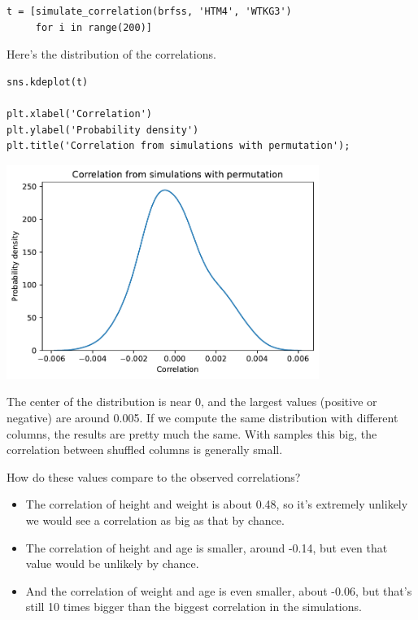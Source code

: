 \begin{lstlisting}[]
t = [simulate_correlation(brfss, 'HTM4', 'WTKG3')
     for i in range(200)]
\end{lstlisting}

Here's the distribution of the correlations.

\begin{lstlisting}[]
sns.kdeplot(t)

plt.xlabel('Correlation')
plt.ylabel('Probability density')
plt.title('Correlation from simulations with permutation');
\end{lstlisting}

\begin{center}
\includegraphics[width=4in]{chapters/13_hypothesis_files/13_hypothesis_107_0.pdf}
\end{center}

The center of the distribution is near 0, and the largest values
(positive or negative) are around 0.005. If we compute the same
distribution with different columns, the results are pretty much the
same. With samples this big, the correlation between shuffled columns is
generally small.

How do these values compare to the observed correlations?

\begin{itemize}
\item
  The correlation of height and weight is about 0.48, so it's extremely
  unlikely we would see a correlation as big as that by chance.
\item
  The correlation of height and age is smaller, around -0.14, but even
  that value would be unlikely by chance.
\item
  And the correlation of weight and age is even smaller, about -0.06,
  but that's still 10 times bigger than the biggest correlation in the
  simulations.
\end{itemize}

